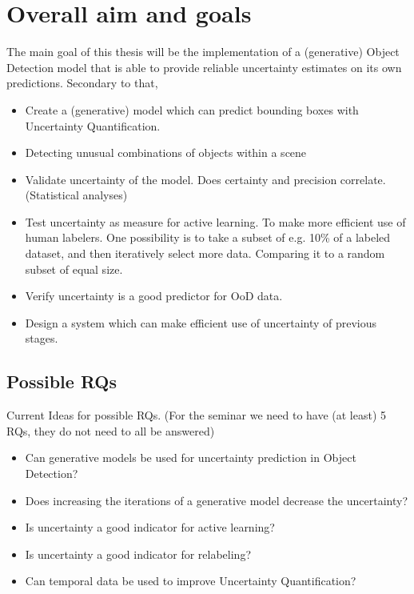 \section{Overall aim and goals}\label{sec:goals}
The main goal of this thesis will be the implementation of a (generative) Object Detection model that is able to provide reliable uncertainty estimates on its own predictions. Secondary to that,
\begin{itemize}
    \item Create a (generative) model which can predict bounding boxes with Uncertainty Quantification.
    \item Detecting unusual combinations of objects within a scene
    \item Validate uncertainty of the model.
          \subitem Does certainty and precision correlate. (Statistical analyses)
    \item Test uncertainty as measure for active learning.
          \subitem To make more efficient use of human labelers. One possibility is to take a subset of e.g. 10\% of a labeled dataset, and then iteratively select more data. Comparing it to a random subset of equal size.
    \item Verify uncertainty is a good predictor for OoD data.
    \item Design a system which can make efficient use of uncertainty of previous stages.
\end{itemize}



\subsection{Possible RQs}
Current Ideas for possible RQs. (For the seminar we need to have (at least) 5 RQs, they do not need to all be answered)

\begin{itemize}
    \item Can generative models be used for uncertainty prediction in Object Detection?
    \item Does increasing the iterations of a generative model decrease the uncertainty?
    \item Is uncertainty a good indicator for active learning?
    \item Is uncertainty a good indicator for relabeling?
    \item Can temporal data be used to improve Uncertainty Quantification?
\end{itemize}

